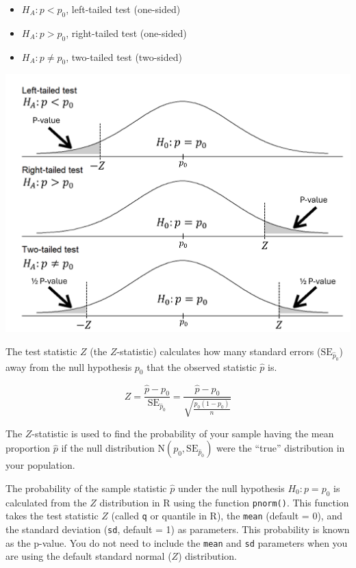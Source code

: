 \documentclass[
  letterpaper,
  DIV=11,
  numbers=noendperiod]{scrartcl}
\begin{document}
\begin{itemize}
\item
  \(H_A \colon p < p_0\), left-tailed test (one-sided)
\item
  \(H_A \colon p > p_0\), right-tailed test (one-sided)
\item
  \(H_A \colon p \ne p_0\), two-tailed test (two-sided)
\end{itemize}

\includegraphics{cheatsheet_files/mediabag/one-sample-prop-test.png}

The test statistic \(Z\) (the \(Z\)-statistic) calculates how many
standard errors (\(\text{SE}_{\hat{p}_0}\)) away from the null
hypothesis \(p_0\) that the observed statistic \(\hat{p}\) is.

\[
Z=\frac{\hat{p}-p_0}{\text{SE}_{\hat{p}_0}}=\frac{\hat{p}-p_0}{\sqrt{\frac{p_0(1-p_0)}{n}}}
\]

The \(Z\)-statistic is used to find the probability of your sample
having the mean proportion \(\hat{p}\) if the null distribution
\(\text{N}\left(p_0, \text{SE}_{\hat{p}_0}\right)\) were the ``true''
distribution in your population.

The probability of the sample statistic \(\hat{p}\) under the null
hypothesis \(H_0 \colon p=p_0\) is calculated from the \(Z\)
distribution in R using the function \texttt{pnorm()}. This function
takes the test statistic \(Z\) (called \texttt{q} or quantile in R), the
\texttt{mean} (default = 0), and the standard deviation (\texttt{sd},
default = 1) as parameters. This probability is known as the p-value.
You do not need to include the \texttt{mean} and \texttt{sd} parameters
when you are using the default standard normal (\(Z\)) distribution.
\end{document}
